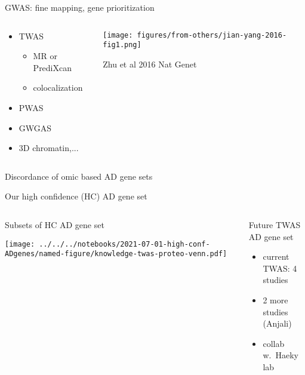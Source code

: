 \documentclass[aspectratio=169]{beamer}
\begin{document}
\begin{frame}{GWAS: fine mapping, gene prioritization}
\begin{columns}[t]
\begin{column}{0.4\textwidth}
\begin{itemize}
\item TWAS
\begin{itemize}
\item MR or PrediXcan
\item colocalization
\end{itemize}
\item PWAS
\item GWGAS
\item 3D chromatin,...
\end{itemize}
\end{column}

\begin{column}{0.7\textwidth}

\texttt{[image: figures/from-others/jian-yang-2016-fig1.png]}

{\tiny Zhu et al 2016 Nat Genet}
\end{column}
\end{columns}
\end{frame}

\begin{frame}{Discordance of omic based AD gene sets}
\end{frame}

\begin{frame}{Our high confidence (HC) AD gene set}
\begin{columns}[t]
\begin{column}{0.5\textwidth}
Subsets of HC AD gene set

\texttt{[image: ../../../notebooks/2021-07-01-high-conf-ADgenes/named-figure/knowledge-twas-proteo-venn.pdf]}
\end{column}

\begin{column}{0.5\textwidth}
Future TWAS AD gene set
\begin{itemize}
\item current TWAS: 4 studies
\item 2 more studies (Anjali)
\item collab w.~Haeky lab
\end{itemize}

\end{column}
\end{columns}
\end{frame}
\end{document}

